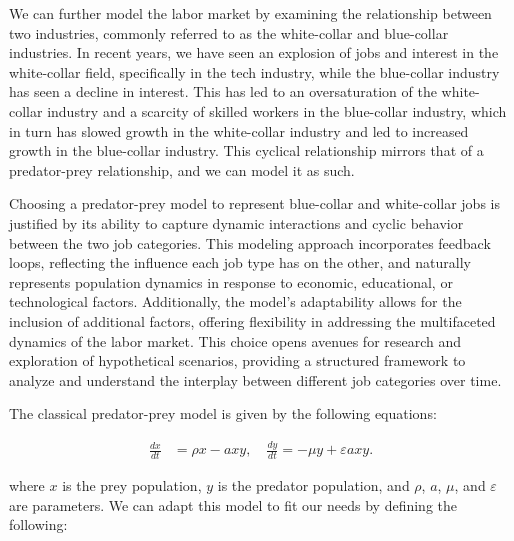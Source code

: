 \documentclass[11pt]{amsart}
\begin{document}
We can further model the labor market by examining the relationship between two industries, commonly referred to as the white-collar and blue-collar industries.
In recent years, we have seen an explosion of jobs and interest in the white-collar field, specifically in the tech industry, while the blue-collar industry has seen a decline in interest.
This has led to an oversaturation of the white-collar industry and a scarcity of skilled workers in the blue-collar industry, which in turn has slowed growth in the white-collar industry and led to increased growth in the blue-collar industry.
This cyclical relationship mirrors that of a predator-prey relationship, and we can model it as such. 

Choosing a predator-prey model to represent blue-collar and white-collar jobs is justified by its ability to capture dynamic interactions and 
cyclic behavior between the two job categories. This modeling approach incorporates feedback loops, reflecting the influence each job type has 
on the other, and naturally represents population dynamics in response to economic, educational, or technological factors. 
Additionally, the model's adaptability allows for the inclusion of additional factors, offering flexibility in addressing 
the multifaceted dynamics of the labor market. This choice opens avenues for research and exploration of hypothetical scenarios, 
providing a structured framework to analyze and understand the interplay between different job categories over time.

The classical predator-prey model is given by the following equations:


\begin{align}
    \frac{dx}{dt} &= \rho x - a x y, \quad \frac{dy}{dt} = -\mu y + \varepsilon a x y.
\end{align}

where $x$ is the prey population, $y$ is the predator population, and $\rho$, $a$, $\mu$, and $\varepsilon$ are parameters. 
We can adapt this model to fit our needs by defining the following:

\end{document}
